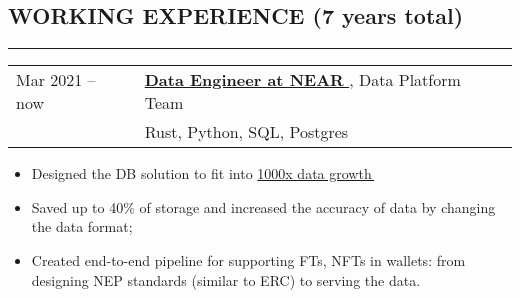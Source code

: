 \documentclass[11pt]{res} %
\let\orighref\href
\renewcommand{\href}[2]{\orighref{#1}{#2\,\faExternalLink}}
\begin{document}
\begin{resume}

        \section{\uppercase{Working Experience} (7 years total)}
        \begin{spacing}{0.3}
            \textcolor[RGB]{220,220,220}{\rule{\linewidth}{0.4pt}}
        \end{spacing}

        \begin{tabular}{ll}
            Mar 2021 -- now \qquad \qquad & \textbf{\href{https://near.org}{Data Engineer at NEAR}}, Data Platform Team \\
            & Rust, Python, SQL, Postgres \\
        \end{tabular}

        \begin{itemize} \itemsep -2pt
            \item Designed the DB solution to fit into \href{https://explorer.near.org/stats}{1000x data growth}
            \item Saved up to 40\% of storage and increased the accuracy of data by changing the data format;
            \item Created end-to-end pipeline for supporting FTs, NFTs in wallets: from designing NEP standards (similar to ERC) to serving the data.
        \end{itemize}


\end{resume}
\end{document}
